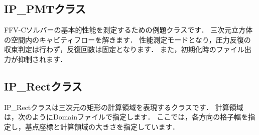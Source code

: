 \subsection{IP\_PMTクラス}
FFV-Cソルバーの基本的性能を測定するための例題クラスです．
三次元立方体の空間内のキャビティフローを解きます．
性能測定モードとなり，圧力反復の収束判定は行わず，反復回数は固定となります．
また，初期化時のファイル出力が抑制されます．

\subsection{IP\_Rectクラス}
IP\_Rectクラスは三次元の矩形の計算領域を表現するクラスです．
計算領域は，次のようにDomainファイルで指定します．
ここでは，各方向の格子幅を指定し，基点座標と計算領域の大きさを指定しています．


